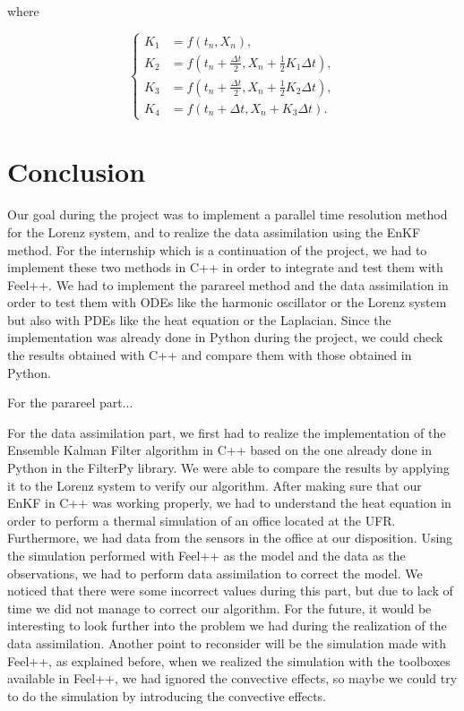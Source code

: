 \documentclass[12pt]{article}
\begin{document}
		\noindent where 
		
		$$\left\{\begin{aligned}
			K_1&=f(t_n,X_n) , \\
			K_2&=f\left(t_n+\frac{\Delta t}{2},X_n+\frac{1}{2} K_1\Delta t\right) , \\
			K_3&=f\left(t_n+\frac{\Delta t}{2},X_n+\frac{1}{2} K_2\Delta t\right) , \\
			K_4&=f\left(t_n+\Delta t,X_n+K_3\Delta t\right) .
		\end{aligned}\right.$$
	
    

	
	\newpage
	
	
	
	\newpage
	
		

	\newpage

	\section{Conclusion}
	\noindent Our goal during the project was to implement a parallel time resolution method for the Lorenz system, and to realize the data assimilation using the EnKF method.
	For the internship which is a continuation of the project, we had to implement these two methods in C++ in order to integrate and test them with Feel++.
	\noindent We had to implement the parareel method and the data assimilation in order to test them with ODEs like the harmonic oscillator or the Lorenz system but also with PDEs like the heat equation or the Laplacian. Since the implementation was already done in Python during the project, we could check the results obtained with C++ and compare them with those obtained in Python.
	
	\noindent For the parareel part...
	
	\noindent For the data assimilation part, we first had to realize the implementation of the Ensemble Kalman Filter algorithm in C++ based on the one already done in Python in the FilterPy library. We were able to compare the results by applying it to the Lorenz system to verify our algorithm. After making sure that our EnKF in C++ was working properly, we had to understand the heat equation in order to perform a thermal simulation of an office located at the UFR. Furthermore, we had data from the sensors in the office at our disposition. Using the simulation performed with Feel++ as the model and the data as the observations, we had to perform data assimilation to correct the model. We noticed that there were some incorrect values during this part, but due to lack of time we did not manage to correct our algorithm. For the future, it would be interesting to look further into the problem we had during the realization of the data assimilation. Another point to reconsider will be the simulation made with Feel++, as explained before, when we realized the simulation with the toolboxes available in Feel++, we had ignored the convective effects, so maybe we could try to do the simulation by introducing the convective effects. 
	
\end{document}
